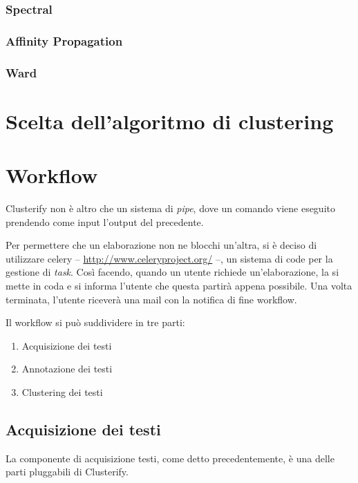 		\subsubsection{Spectral}
			

		\subsubsection{Affinity Propagation}
			

		\subsubsection{Ward}
			
		

\section{Scelta dell'algoritmo di clustering}
	

\section{Workflow}
	Clusterify non è altro che un sistema di \emph{pipe}, dove un comando viene eseguito prendendo come input l'output del precedente.

	Per permettere che un elaborazione non ne blocchi un'altra, si è deciso di utilizzare celery -- \url{http://www.celeryproject.org/} --, un sistema di code per la gestione di \emph{task}. Così facendo, quando un utente richiede un'elaborazione, la si mette in coda e si informa l'utente che questa partirà appena possibile. Una volta terminata, l'utente riceverà una mail con la notifica di fine workflow.

	Il workflow si può suddividere in tre parti:

	\begin{enumerate}
  		\item Acquisizione dei testi
  		\item Annotazione dei testi
 		\item Clustering dei testi
	\end{enumerate} 
	
	\subsection{Acquisizione dei testi}
		La componente di acquisizione testi, come detto precedentemente, è una delle parti pluggabili di Clusterify.


